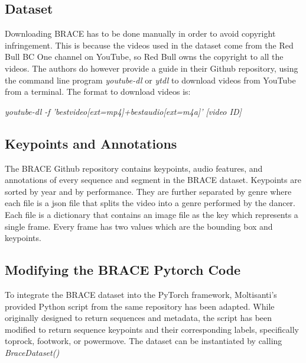 \documentclass[12pt]{article}
\begin{document}
\subsection{Dataset}
\par
Downloading BRACE has to be done manually in order to avoid copyright infringement. This is because the videos used in the dataset come from the Red Bull BC One channel on YouTube, so Red Bull owns the copyright to all the videos. The authors do however provide a guide in their Github repository, using the command line program \textit{youtube-dl} or \textit{ytdl} to download videos from YouTube from a terminal. The format to download videos is:

    \textit{youtube-dl -f 'bestvideo[ext=mp4]+bestaudio[ext=m4a]' [video ID]}


\subsection{Keypoints and Annotations}
\par
The BRACE Github repository \Textcite{brace} contains keypoints, audio features, and annotations of every sequence and segment in the BRACE dataset. Keypoints are sorted by year and by performance. They are further separated by genre where each file is a json file that splits the video into a genre performed by the dancer. Each file is a dictionary that contains an image file as the key which represents a single frame. Every frame has two values which are the bounding box and keypoints.

\subsection{Modifying the BRACE Pytorch Code}
\par To integrate the BRACE dataset into the PyTorch framework, Moltisanti's provided Python script from the same repository has been adapted. While originally designed to return sequences and metadata, the script has been modified to return sequence keypoints and their corresponding labels, specifically toprock, footwork, or powermove. The dataset can be instantiated by calling \textit{BraceDataset()}
\end{document}
